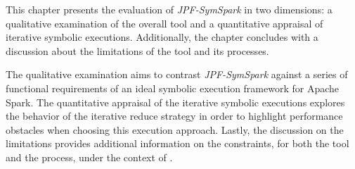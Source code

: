 
This chapter presents the evaluation of \textit{JPF-SymSpark} in two dimensions: a qualitative examination of the overall tool and a quantitative appraisal of iterative symbolic executions. Additionally, the chapter concludes with a discussion about the limitations of the tool and its processes. 

The qualitative examination aims to contrast \textit{JPF-SymSpark} against a series of functional requirements of an ideal symbolic execution framework for Apache Spark. The quantitative appraisal of the iterative symbolic executions explores the behavior of the iterative reduce strategy in order to highlight performance obstacles when choosing this execution approach. Lastly, the discussion on the limitations provides additional information on the constraints, for both the tool and the process, under the context of \jpf{}.




